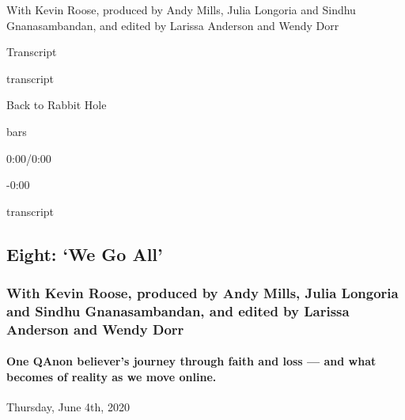 With Kevin Roose, produced by Andy Mills, Julia Longoria and Sindhu
Gnanasambandan, and edited by Larissa Anderson and Wendy Dorr

Transcript

transcript

Back to Rabbit Hole

bars

0:00/0:00

-0:00

transcript

\hypertarget{eight-we-go-all-2}{%
\subsection{Eight: `We Go All'}\label{eight-we-go-all-2}}

\hypertarget{with-kevin-roose-produced-by-andy-mills-julia-longoria-and-sindhu-gnanasambandan-and-edited-by-larissa-anderson-and-wendy-dorr-1}{%
\subsubsection{With Kevin Roose, produced by Andy Mills, Julia Longoria
and Sindhu Gnanasambandan, and edited by Larissa Anderson and Wendy
Dorr}\label{with-kevin-roose-produced-by-andy-mills-julia-longoria-and-sindhu-gnanasambandan-and-edited-by-larissa-anderson-and-wendy-dorr-1}}

\hypertarget{one-qanon-believers-journey-through-faith-and-loss--and-what-becomes-of-reality-as-we-move-online-2}{%
\paragraph{One QAnon believer's journey through faith and loss --- and
what becomes of reality as we move
online.}\label{one-qanon-believers-journey-through-faith-and-loss--and-what-becomes-of-reality-as-we-move-online-2}}

Thursday, June 4th, 2020

